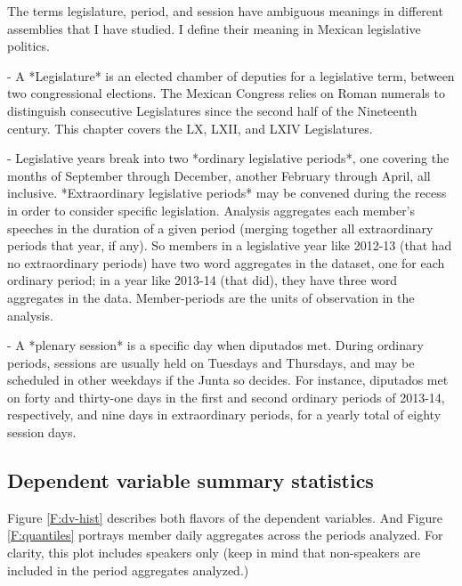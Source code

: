 \documentclass[letter,12pt]{article}
\begin{document}
The terms legislature, period, and session have ambiguous meanings in different assemblies that I have studied. I define their meaning in Mexican legislative politics.

- A *Legislature* is an elected chamber of deputies for a legislative term, between two congressional elections. The Mexican Congress relies on Roman numerals to distinguish consecutive Legislatures since the second half of the Nineteenth century. This chapter covers the LX, LXII, and LXIV Legislatures.

- Legislative years break into two *ordinary legislative periods*, one covering the months of September through December, another February through April, all inclusive. *Extraordinary legislative periods* may be convened during the recess in order to consider specific legislation. Analysis aggregates each member's speeches in the duration of a given period (merging together all extraordinary periods that year, if any). So members in a legislative year like 2012-13 (that had no extraordinary periods) have two word aggregates in the dataset, one for each ordinary period; in a year like 2013-14 (that did), they have three word aggregates in the data. Member-periods are the units of observation in the analysis. 

- A *plenary session* is a specific day when diputados met. During ordinary periods, sessions are usually held on Tuesdays and Thursdays, and may be scheduled in other weekdays if the Junta so decides. For instance, diputados met on forty and thirty-one days in the first and second ordinary periods of 2013-14, respectively, and nine days in extraordinary periods, for a yearly total of eighty session days.

\subsection{Dependent variable summary statistics}

Figure \ref{F:dv-hist} describes both flavors of the dependent variables. And Figure \ref{F:quantiles} portrays member daily aggregates across the periods analyzed. For clarity, this plot includes speakers only (keep in mind that non-speakers are included in the period aggregates analyzed.)
\end{document}
